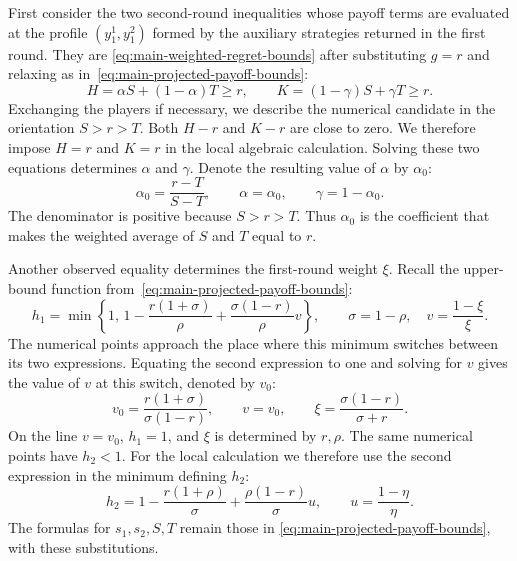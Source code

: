 \documentclass[11pt]{article}
\theoremstyle{remark}
\theoremstyle{plain}
\begin{document}
First consider the two second-round inequalities whose payoff terms
are evaluated at the profile
$(y_1^1,y_1^2)$ formed by the auxiliary strategies returned in the
first round. They are
\eqref{eq:main-weighted-regret-bounds} after substituting $g=r$ and
relaxing as in~\eqref{eq:main-projected-payoff-bounds}:
\begin{equation}
 H=\alpha S+(1-\alpha)T\ge r,\qquad
 K=(1-\gamma)S+\gamma T\ge r.
 \label{eq:main-discovery-hk}
\end{equation}
Exchanging the players if necessary, we describe the numerical
candidate in the orientation $S>r>T$. Both $H-r$ and $K-r$
are close to zero. We therefore impose $H=r$ and $K=r$ in the
local algebraic calculation. Solving these two equations determines
$\alpha$ and $\gamma$. Denote the resulting value of $\alpha$ by $\alpha_0$:
\begin{equation}
 \alpha_0=\frac{r-T}{S-T},\qquad \alpha=\alpha_0,\qquad\gamma=1-\alpha_0.
 \label{eq:main-discovery-weights}
\end{equation}
The denominator is positive because $S>r>T$.
Thus $\alpha_0$ is the coefficient that makes the weighted average of
$S$ and $T$ equal to $r$.

Another observed equality determines the first-round weight $\xi$.
Recall the upper-bound function from~\eqref{eq:main-projected-payoff-bounds}:
\begin{equation}
 h_1=\min\left\{1,\,
  1-\frac{r(1+\sigma)}\rho+\frac{\sigma(1-r)}\rho v\right\},
 \qquad \sigma=1-\rho,\quad v=\frac{1-\xi}{\xi}.
 \label{eq:main-discovery-h1}
\end{equation}
The numerical points approach the place where this minimum switches
between its two expressions. Equating the second expression to one and
solving for $v$ gives the value of $v$ at this switch, denoted by $v_0$:
\begin{equation}
 v_0=\frac{r(1+\sigma)}{\sigma(1-r)},\qquad
 v=v_0,\qquad \xi=\frac{\sigma(1-r)}{\sigma+r}.
 \label{eq:main-discovery-cap-switch}
\end{equation}
On the line $v=v_0$, $h_1=1$, and $\xi$ is determined by $r,\rho$.
The same numerical points have $h_2<1$. For the local calculation
we therefore use the second expression in the minimum defining $h_2$:
\begin{equation}
 h_2=1-\frac{r(1+\rho)}\sigma
              +\frac{\rho(1-r)}\sigma u,\qquad u=\frac{1-\eta}{\eta}.
 \label{eq:main-discovery-h2}
\end{equation}
The formulas for $s_1,s_2,S,T$ remain those in
\eqref{eq:main-projected-payoff-bounds}, with these substitutions.
\end{document}
